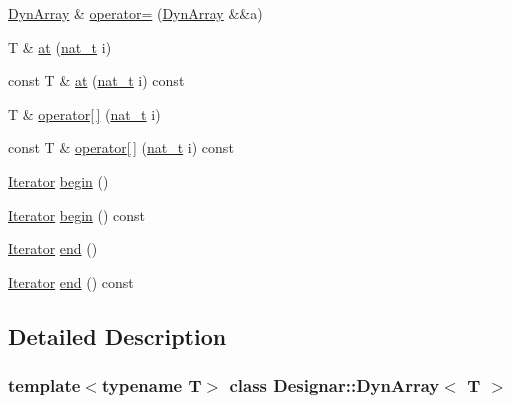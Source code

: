 \begin{DoxyCompactItemize}
\item 
\hyperlink{class_designar_1_1_dyn_array}{Dyn\+Array} \& \hyperlink{class_designar_1_1_dyn_array_a80a5538e26254acd5d2449a8364918da}{operator=} (\hyperlink{class_designar_1_1_dyn_array}{Dyn\+Array} \&\&a)
\item 
T \& \hyperlink{class_designar_1_1_dyn_array_a117ba8cd3a9275b36d713a0ef3aef0e3}{at} (\hyperlink{namespace_designar_aa72662848b9f4815e7bf31a7cf3e33d1}{nat\+\_\+t} i)
\item 
const T \& \hyperlink{class_designar_1_1_dyn_array_a0bb20c2467a91bad1577fae7bed15828}{at} (\hyperlink{namespace_designar_aa72662848b9f4815e7bf31a7cf3e33d1}{nat\+\_\+t} i) const
\item 
T \& \hyperlink{class_designar_1_1_dyn_array_ac24a3b500af13093ade4978739e2d6e3}{operator\mbox{[}$\,$\mbox{]}} (\hyperlink{namespace_designar_aa72662848b9f4815e7bf31a7cf3e33d1}{nat\+\_\+t} i)
\item 
const T \& \hyperlink{class_designar_1_1_dyn_array_af329e06efe69cb53e9d1a44a1ed0beeb}{operator\mbox{[}$\,$\mbox{]}} (\hyperlink{namespace_designar_aa72662848b9f4815e7bf31a7cf3e33d1}{nat\+\_\+t} i) const
\item 
\hyperlink{class_designar_1_1_dyn_array_1_1_iterator}{Iterator} \hyperlink{class_designar_1_1_dyn_array_aa8032abbe4db89827ac88aa1ea932712}{begin} ()
\item 
\hyperlink{class_designar_1_1_dyn_array_1_1_iterator}{Iterator} \hyperlink{class_designar_1_1_dyn_array_a36886c618a763286ec179f7fc7cffa68}{begin} () const
\item 
\hyperlink{class_designar_1_1_dyn_array_1_1_iterator}{Iterator} \hyperlink{class_designar_1_1_dyn_array_a1a6bfcf9c4cd8d54138339b9313661f3}{end} ()
\item 
\hyperlink{class_designar_1_1_dyn_array_1_1_iterator}{Iterator} \hyperlink{class_designar_1_1_dyn_array_ab2ff81ff5bfeefbcd0a302da9effff89}{end} () const
\end{DoxyCompactItemize}


\subsection{Detailed Description}
\subsubsection*{template$<$typename T$>$\newline
class Designar\+::\+Dyn\+Array$<$ T $>$}



